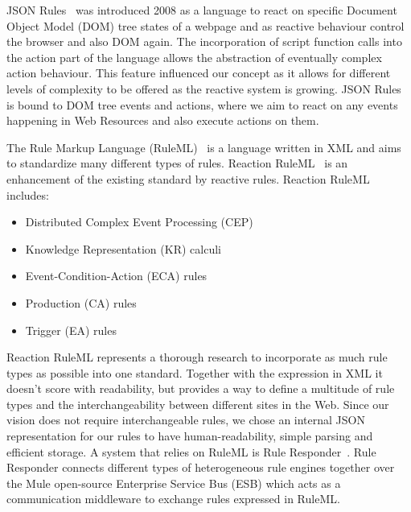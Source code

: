 \textrm{JSON Rules}~\cite{2008-Giurca_Pascalau-JSON_Rules.pdf} was introduced 2008 as a language to react on specific \textrm{Document Object Model} (\textrm{DOM}) tree states of a webpage and as reactive behaviour control the browser and also \textrm{DOM} again.
The incorporation of script function calls into the action part of the language allows the abstraction of eventually complex action behaviour.
This feature influenced our concept as it allows for different levels of complexity to be offered as the reactive system is growing.
\textrm{JSON Rules} is bound to \textrm{DOM} tree events and actions, where we aim to react on any events happening in Web Resources and also execute actions on them.

The \textrm{Rule Markup Language} (\textrm{RuleML})~\cite{2006-Boley-RuleML.pdf} is a language written in \textrm{XML} and aims to standardize many different types of rules.
\textrm{Reaction RuleML}~\cite{2012-Paschke_etal-ReactionRuleML.pdf} is an enhancement of the existing standard by reactive rules.
\textrm{Reaction RuleML} includes:
\begin{itemize}
  \item Distributed Complex Event Processing (\textrm{CEP})
  \item Knowledge Representation (\textrm{KR}) calculi
  \item Event-Condition-Action (\textrm{ECA}) rules
  \item Production (\textrm{CA}) rules
  \item Trigger (\textrm{EA}) rules
\end{itemize}
\textrm{Reaction RuleML} represents a thorough research to incorporate as much rule types as possible into one standard.
Together with the expression in \textrm{XML} it doesn't score with readability, but provides a way to define a multitude of rule types and the interchangeability between different sites in the Web.
Since our vision does not require interchangeable rules, we chose an internal JSON representation for our rules to have human-readability, simple parsing and efficient storage.
A system that relies on \textrm{RuleML} is \textrm{Rule Responder}~\cite{2007-Paschke_etal-RuleResponder.pdf}.
\textrm{Rule Responder} connects different types of heterogeneous rule engines together over the \textrm{Mule} open-source \textrm{Enterprise Service Bus} (\textrm{ESB}) which acts as a communication middleware to exchange rules expressed in \textrm{RuleML}.

